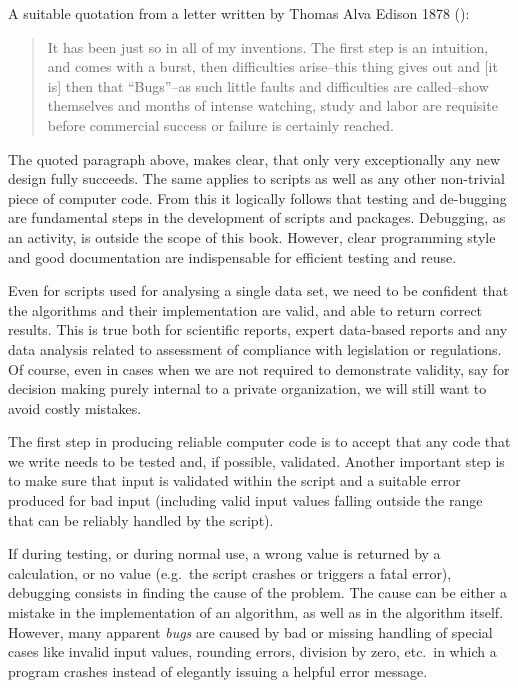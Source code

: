 \documentclass[krantz2]{krantz}\usepackage{knitr}%
\begin{document}
A suitable quotation from a letter written by Thomas Alva Edison 1878 (\autocite{Hughes2004}):
\begin{quote}
  It has been just so in all of my inventions. The first step is an intuition, and comes with a burst, then difficulties arise--this thing gives out and [it is] then that ``Bugs''--as such little faults and difficulties are called--show themselves and months of intense watching, study and labor are requisite before commercial success or failure is certainly reached.
\end{quote}

The quoted paragraph above, makes clear, that only very exceptionally any new design fully succeeds. The same applies to \Rlang scripts as well as any other non-trivial piece of computer code. From this it logically follows that testing and de-bugging are fundamental steps in the development of \Rlang scripts and packages. Debugging, as an activity, is outside the scope of this book. However, clear programming style and good documentation are indispensable for efficient testing and reuse.

Even for scripts used for analysing a single data set, we need to be confident that the algorithms and their implementation are valid, and able to return correct results. This is true both for scientific reports, expert data-based reports and any data analysis related to assessment of compliance with legislation or regulations. Of course, even in cases when we are not required to demonstrate validity, say for decision making purely internal to a private organization, we will still want to avoid costly mistakes.

The first step in producing reliable computer code is to accept that any code that we write needs to be tested and, if possible, validated. Another important step is to make sure that input is validated within the script and a suitable error produced for bad input (including valid input values falling outside the range that can be reliably handled by the script).

If during testing, or during normal use, a wrong value is returned by a calculation, or no value (e.g.\ the script crashes or triggers a fatal error), debugging consists in finding the cause of the problem. The cause can be either a mistake in the implementation of an algorithm, as well as in the algorithm itself. However, many apparent \emph{bugs} are caused by bad or missing handling of special cases like invalid input values, rounding errors, division by zero, etc.\ in which a program crashes instead of elegantly issuing a helpful error message.
\end{document}
